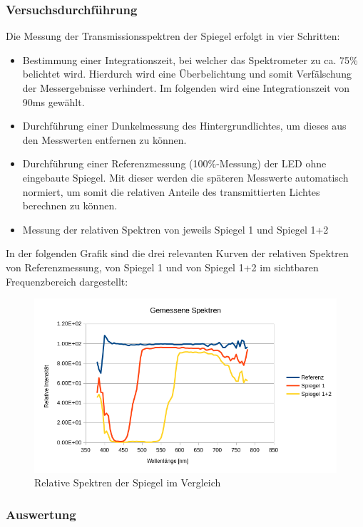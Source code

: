 \subsubsection{Versuchsdurchführung}

Die Messung der Transmissionsspektren der Spiegel erfolgt in vier Schritten:
\begin{itemize}
\item Bestimmung einer Integrationszeit, bei welcher das Spektrometer zu ca. 75\% belichtet wird. Hierdurch wird eine Überbelichtung und somit Verfälschung der Messergebnisse verhindert. Im folgenden wird eine Integrationszeit von 90ms gewählt.
\item Durchführung einer Dunkelmessung des Hintergrundlichtes, um dieses aus den Messwerten entfernen zu können.
\item Durchführung einer Referenzmessung (100\%-Messung) der LED ohne eingebaute Spiegel. Mit dieser werden die späteren Messwerte automatisch normiert, um somit die relativen Anteile des transmittierten Lichtes berechnen zu können.
\item Messung der relativen Spektren von jeweils Spiegel 1 und Spiegel 1+2
\end{itemize}
In der folgenden Grafik sind die drei relevanten Kurven der relativen Spektren von Referenzmessung, von Spiegel 1 und von Spiegel 1+2 im sichtbaren Frequenzbereich dargestellt:

\begin{figure}[h]
	\centering
	\includegraphics[scale=0.8]{Images/V1_Spektren.png}
	\caption{Relative Spektren der Spiegel im Vergleich}
	\label{V1_RES}
\end{figure}

\subsubsection{Auswertung}

